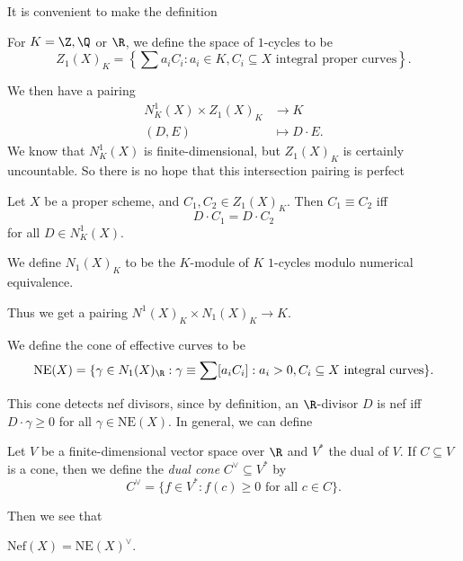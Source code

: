 \documentclass[a4paper]{article}
\newcommand\Nef{\mathrm{Nef}}
\newcommand\NE{\mathrm{NE}}
\begin{document}
It is convenient to make the definition

\begin{defi}[1-cycles]
  For $K = \Z, \Q$ or $\R$, we define the space of $1$-cycles to be
  \[
    Z_1(X)_K = \left\{\sum a_i C_i : a_i \in K, C_i \subseteq X\text{ integral proper curves}\right\}.
  \]
\end{defi}
We then have a pairing
\begin{align*}
  N^1_K(X) \times Z_1(X)_K &\to K\\
  (D, E) &\mapsto D \cdot E.
\end{align*}
We know that $N^1_K(X)$ is finite-dimensional, but $Z_1(X)_K$ is certainly uncountable. So there is no hope that this intersection pairing is perfect
\begin{defi}\index{$\equiv$}
  Let $X$ be a proper scheme, and $C_1, C_2 \in Z_1(X)_K$. Then $C_1 \equiv C_2$ iff
  \[
    D \cdot C_1 = D \cdot C_2
  \]
  for all $D \in N^1_K(X)$.
\end{defi}

\begin{defi}[$N_1(X)_K$]
  We define $N_1(X)_K$ to be the $K$-module of $K$ $1$-cycles modulo numerical equivalence.
\end{defi}
Thus we get a pairing $N^1(X)_K \times N_1(X)_K \to K$.

\begin{defi}
  We define the cone of effective curves to be
  \[
    \NE(X) = \{\gamma \in N_1(X)_\R : \gamma \equiv \sum [a_i C_i]: a_i > 0, C_i \subseteq X\text{ integral curves}\}.
  \]
\end{defi}
This cone detects nef divisors, since by definition, an $\R$-divisor $D$ is nef iff $D \cdot \gamma \geq 0$ for all $\gamma \in \NE(X)$. In general, we can define

\begin{defi}
  Let $V$ be a finite-dimensional vector space over $\R$ and $V^*$ the dual of $V$. If $C \subseteq V$ is a cone, then we define the \emph{dual cone} $C^\vee \subseteq V^*$ by
  \[
    C^\vee = \{f \in V^* : f(c) \geq 0\text{ for all }c \in C\}.
  \]
\end{defi}
Then we see that
\begin{prop}
  $\Nef(X) = \NE(X)^\vee$.\fakeqed
\end{prop}
\end{document}
